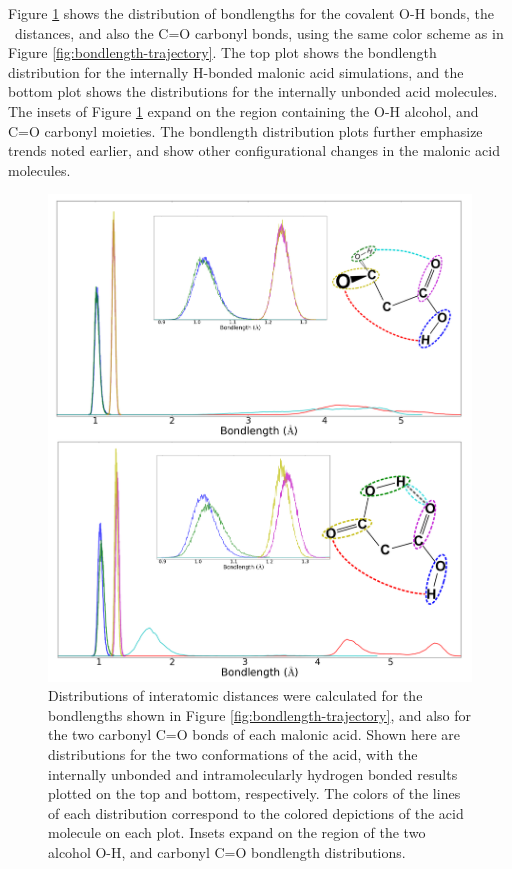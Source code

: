 Figure \ref{fig:bondlength-distribution} shows the distribution of bondlengths for the covalent O-H bonds, the \ocarbh~distances, and also the C=O carbonyl bonds, using the same color scheme as in Figure \ref{fig:bondlength-trajectory}. The top plot shows the bondlength distribution for the internally H-bonded malonic acid simulations, and the bottom plot shows the distributions for the internally unbonded acid molecules. The insets of Figure \ref{fig:bondlength-distribution} expand on the region containing the O-H alcohol, and C=O carbonyl moieties. The bondlength distribution plots further emphasize trends noted earlier, and show other configurational changes in the malonic acid molecules.

\begin{figure}[h!]
	\begin{center}
		\includegraphics[scale=1.0]{images/bond-length/BondLengthDistros.png}
		\caption{Distributions of interatomic distances were calculated for the bondlengths shown in Figure \ref{fig:bondlength-trajectory}, and also for the two carbonyl C=O bonds of each malonic acid. Shown here are distributions for the two conformations of the acid, with the internally unbonded and intramolecularly hydrogen bonded results plotted on the top and bottom, respectively. The colors of the lines of each distribution correspond to the colored depictions of the acid molecule on each plot. Insets expand on the region of the two alcohol O-H, and carbonyl C=O bondlength distributions.}
		\label{fig:bondlength-distribution}
	\end{center}
\end{figure}

